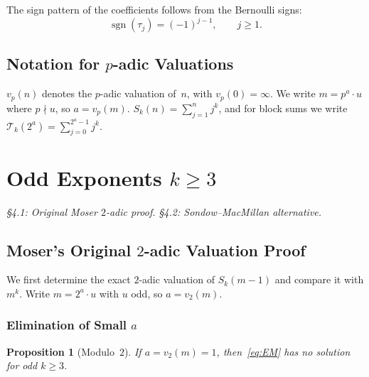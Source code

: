 \documentclass[12pt,a4paper]{article}
\theoremstyle{plain}
\newtheorem{proposition}[theorem]{Proposition}
\theoremstyle{definition}
\newcommand{\Tk}{\mathcal{T}_{k}}
\begin{document}
The sign pattern of the coefficients follows from the Bernoulli signs:
\begin{equation}\label{eq:tau-sign}
  \operatorname{sgn}(\tau_j) = (-1)^{j-1}, \qquad j \ge 1.
\end{equation}

\subsection{Notation for $p$-adic Valuations}

$v_p(n)$ denotes the $p$-adic valuation of~$n$, with $v_p(0) = \infty$.
We write $m = p^a \cdot u$ where $p \nmid u$, so $a = v_p(m)$.
$S_k(n) = \sum_{j=1}^{n} j^k$, and for block sums we write
$\Tk(2^a) = \sum_{j=0}^{2^a-1} j^k$.

\section{Odd Exponents $k \ge 3$}
\label{sec:odd}

{\small\hfill\textit{§4.1: Original Moser $2$-adic proof. §4.2: Sondow--MacMillan alternative.}}

\subsection{Moser's Original $2$-adic Valuation Proof}
\label{sec:2adic}

We first determine the exact $2$-adic valuation of $S_k(m-1)$ and compare it
with $m^k$.  Write $m = 2^a \cdot u$ with $u$ odd, so $a = v_2(m)$.

\subsubsection{Elimination of Small $a$}
\label{sec:small-a}

\begin{proposition}[Modulo~$2$]\label{prop:mod2}
  If $a = v_2(m) = 1$, then~\eqref{eq:EM} has no solution for odd $k \ge 3$.
\end{proposition}
\end{document}

